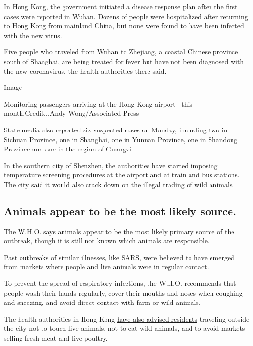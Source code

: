 In Hong Kong, the government
\href{https://www.info.gov.hk/gia/general/202001/04/P2020010400179.htm}{initiated
a disease response plan} after the first cases were reported in Wuhan.
\href{https://www.chp.gov.hk/files/pdf/enhanced_sur_pneumonia_wuhan_eng.pdf}{Dozens
of people were hospitalized} after returning to Hong Kong from mainland
China, but none were found to have been infected with the new virus.

Five people who traveled from Wuhan to Zhejiang, a coastal Chinese
province south of Shanghai, are being treated for fever but have not
been diagnosed with the new coronavirus, the health authorities there
said.

Image

Monitoring passengers arriving at the Hong Kong airport~ this
month.Credit...Andy Wong/Associated Press

State media also reported six suspected cases on Monday, including two
in Sichuan Province, one in Shanghai, one in Yunnan Province, one in
Shandong Province and one in the region of Guangxi.

In the southern city of Shenzhen, the authorities have started imposing
temperature screening procedures at the airport and at train and bus
stations. The city said it would also crack down on the illegal trading
of wild animals.

\hypertarget{animals-appear-to-be-the-most-likely-source}{%
\subsection{Animals appear to be the most likely
source.}\label{animals-appear-to-be-the-most-likely-source}}

The W.H.O. says animals appear to be the most likely primary source of
the outbreak, though it is still not known which animals are
responsible.

Past outbreaks of similar illnesses, like SARS, were believed to have
emerged from markets where people and live animals were in regular
contact.

To prevent the spread of respiratory infections, the W.H.O. recommends
that people wash their hands regularly, cover their mouths and noses
when coughing and sneezing, and avoid direct contact with farm or wild
animals.

The health authorities in Hong Kong
\href{https://www.chp.gov.hk/en/features/102465.html}{have also advised
residents} traveling outside the city not to touch live animals, not to
eat wild animals, and to avoid markets selling fresh meat and live
poultry.


